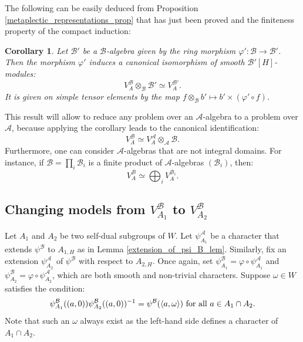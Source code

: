 \documentclass[11pt]{article}
\theoremstyle{plain}
\newtheorem{cor}[theo]{Corollary}
\theoremstyle{definition}
\theoremstyle{plain}
\theoremstyle{definition}
\theoremstyle{plain}
\begin{document}
The following can be easily deduced from Proposition \ref{metaplectic_representations_prop} that has just been proved and the finiteness property of the compact induction:

\begin{cor} \label{metaplectic_representations_cor} Let $\mathcal{B}'$ be a $\mathcal{B}$-algebra given by the ring morphism $\varphi' : \mathcal{B} \to \mathcal{B}'$. Then the morphism $\varphi'$ induces a canonical isomorphism of smooth $\mathcal{B}'[H]$-modules:
$$V_A^\mathcal{B} \otimes_\mathcal{B} \mathcal{B}' \simeq V_A^{\mathcal{B}'}.$$
It is given on simple tensor elements by the map $f \otimes_\mathcal{B} b' \mapsto b' \times (\varphi' \circ f)$. \end{cor} 

This result will allow to reduce any problem over an $\mathcal{A}$-algebra to a problem over $\mathcal{A}$, because applying the corollary leads to the canonical identification:
$$V_A^\mathcal{B} \simeq V_A^\mathcal{A} \otimes_\mathcal{A} \mathcal{B}.$$
Furthermore, one can consider $\mathcal{A}$-algebras that are not integral domains. For instance, if $\mathcal{B} = \prod_i \mathcal{B}_i$ is a finite product of $\mathcal{A}$-algebras $(\mathcal{B}_i)$, then:
$$V_A^\mathcal{B} \simeq \bigoplus_i V_A^{\mathcal{B}_i}.$$

\subsection{Changing models from $V_{A_1}^\mathcal{B}$ to $V_{A_2}^\mathcal{B}$} \label{changing_models_section}

Let $A_1$ and $A_2$ be two self-dual subgroups of $W$. Let $\psi_{A_1}^\mathcal{A}$ be a character that extends $\psi^\mathcal{B}$ to $A_{1,H}$ as in Lemma \ref{extension_of_psi_B_lem}. Similarly, fix an extension $\psi_{A_2}^\mathcal{A}$ of $\psi^\mathcal{B}$ with respect to $A_{2,H}$. Once again, set $\psi_{A_1}^\mathcal{B} = \varphi \circ \psi_{A_1}^\mathcal{A}$ and $\psi_{A_2}^\mathcal{B} = \varphi \circ \psi_{A_2}^\mathcal{A}$, which are both smooth and non-trivial characters. Suppose $\omega \in W$ satisfies the condition:
$$\psi_{A_1}^\mathcal{B} ((a,0)) \psi_{A_2}^\mathcal{B} ((a,0))^{-1} = \psi^\mathcal{B}( \langle a ,\omega \rangle) \textup{ for all } a \in A_1 \cap A_2.$$
Note that such an $\omega$ always exist as the left-hand side defines a character of $A_1 \cap A_2$.
\end{document}
